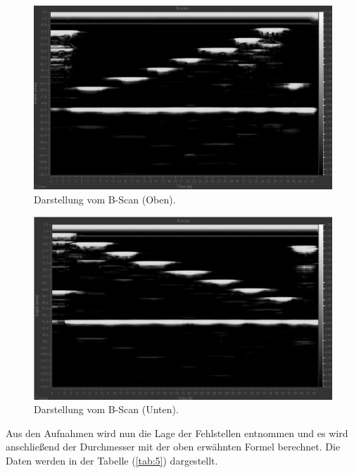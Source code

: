 \begin{figure}[H]
  \centering
  \includegraphics[width=\textwidth]{content/B-Scan2.png}
  \caption{Darstellung vom B-Scan (Oben).}
  \label{abb:5}
\end{figure}
\begin{figure}[H]
  \centering
  \includegraphics[width=\textwidth]{content/B-Scan1.png}
  \caption{Darstellung vom B-Scan (Unten).}
  \label{abb:6}
\end{figure}
Aus den Aufnahmen wird nun die Lage der Fehlstellen entnommen und es wird
anschließend der Durchmesser mit der oben erwähnten Formel berechnet. Die Daten werden
in der Tabelle (\ref{tab:5}) dargestellt.
